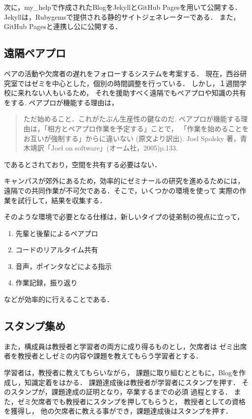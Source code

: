 \documentclass{hissymp}
\begin{document}
次に，my\_helpで作成されたBlogをJekyllとGitHub Pagesを用いて公開する．
Jekyllは，Rubygemsで提供される静的サイトジェネレーターである．
また，GitHub Pagesと連携し公に公開する．

\subsection{遠隔ペアプロ}
\label{sec:orgc4a243e}
ペアの活動や欠席者の遅れをフォローするシステムを考案する．
現在，西谷研究室ではゼミを中心とした，個別の時間調整を行っている．
しかし，１週間学校に来れない人もいるため，
それを援助すべく遠隔でもペアプロや知識の共有をする.
ペアプロが機能する理由は，
\begin{quote}
ただ始めること．これがたぶん生産性の鍵なのだ.
ペアプロが機能する理由は，「相方とペアプロ作業を予定する」ことで，
「作業を始めることをお互いが強制する」からに違いない
(原文より訳出).
Joel Spolsky 著，青木靖訳「Joel on software」(オーム社，2005)p.133.
\end{quote}
であるとされており，空間を共有する必要はない．

キャンパスが郊外にあるため，効率的にゼミナールの研究を進めるためには，
遠隔での共同作業が不可欠である．そこで，いくつかの環境を使って
実際の作業を試行して，結果を収集する．

そのような環境で必要となる仕様は，新しいタイプの徒弟制の視点に立って，
\begin{enumerate}
\item 先輩と後輩によるペアプロ
\item コードのリアルタイム共有
\item 音声，ポインタなどによる指示
\item 作業記録，振り返り
\end{enumerate}
などが効率的に行えることである．

\subsection{スタンプ集め}
\label{sec:orgb2e0ab7}
また，構成員は教授者と学習者の両方に成り得るものとし，欠席者は
ゼミ出席者を教授者としゼミの内容や課題を教えてもらう学習者とする．

学習者は，教授者に教えてもらいながら，
課題に取り組むとともに，Blogを作成し，知識定着をはかる．
課題達成後は教授者が学習者にスタンプを押す．
そのスタンプが，課題達成の証明となり，卒業するまでの必須
過程とする．
また，ゼミ欠席者でも教授者にスタンプを押してもらうと，
教授者としての資格を獲得し，
他の欠席者に教える事ができ，課題達成後はスタンプを押す．
\end{document}
